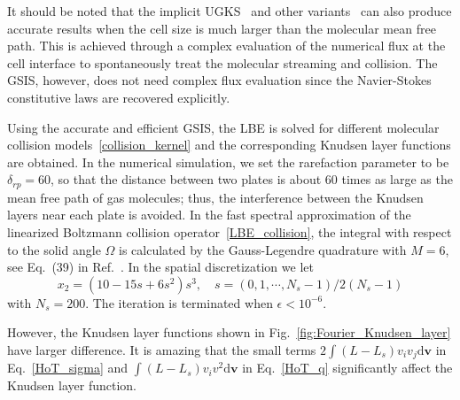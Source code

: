 It should be noted that the implicit UGKS~\cite{Zhu2019JCP} and other variants~\cite{yang2018PoF,yang2018PRE} can also produce accurate results when the cell size is much larger than the molecular mean free path. This is achieved through a complex evaluation of the numerical flux at the cell interface to spontaneously treat the molecular streaming and collision. The GSIS, however, does not need complex flux evaluation since the Navier-Stokes constitutive laws are recovered explicitly. 



Using the accurate and efficient GSIS, the LBE is solved for different molecular collision models~\eqref{collision_kernel} and the corresponding Knudsen layer functions are obtained. In the numerical simulation, we set the rarefaction parameter to be $\delta_{rp}=60$, so that the distance between two plates is about 60 times as large as the mean free path of gas molecules; thus, the interference between the Knudsen layers near each plate is avoided. In the fast spectral approximation of the linearized Boltzmann collision operator~\eqref{LBE_collision}, the integral with respect to the solid angle $\Omega$ is calculated by the Gauss-Legendre quadrature with $M=6$, see Eq.~(39) in Ref.~\cite{Lei2013}. In the spatial discretization we let
\begin{equation}\label{space_discrete}
x_2=(10-15s+6s^2)s^3, \quad s=(0,1,\cdots,N_s-1)/2(N_s-1)
\end{equation}
with $N_s=200$. The iteration is terminated when $\epsilon<10^{-6}$.




 However, the Knudsen layer functions shown in Fig.~\ref{fig:Fourier_Knudsen_layer} have larger difference. It is amazing that the small terms $2\int{(L-L_s)v_iv_j}\mathrm{d}\bm{v}$ in Eq.~\eqref{HoT_sigma} and $\int{(L-L_s)v_iv^2} \mathrm{d}\bm{v}$ in Eq.~\eqref{HoT_q} significantly affect the Knudsen layer function.

